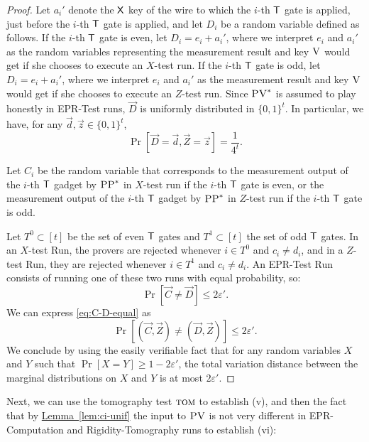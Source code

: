 \documentclass[11pt]{article}
\numberwithin{equation}{section}
\theoremstyle{definition}
\theoremstyle{plain}
\newcommand{\expref}[2]{\hyperref[#2]{#1~\ref{#2}}}
\newcommand{\eps}{\varepsilon}
\newcommand{\tom}{\textsc{tom}}
\newcommand{\ver}{\textsc{V}}
\newcommand{\pv}{\textsc{PV}}
\newcommand{\pp}{\textsc{PP}}
\begin{document}
\begin{proof}
Let $a_i'$ denote the $\sf X$ key of the wire to which the $i$-th $\sf T$ gate is applied, just before the $i$-th $\sf T$ gate is applied, and let $D_i$ be a random variable defined as follows. If the $i$-th $\sf T$ gate is even, let $D_i=e_i+a_i'$, where we interpret $e_i$ and $a_i'$ as the random variables representing the measurement result and key $\ver$ would get if she chooses to execute an $X$-test run. If the $i$-th $\sf T$ gate is odd, let $D_i=e_i+a_i'$, where we interpret $e_i$ and $a_i'$ as the measurement result and key $\ver$ would get if she chooses to execute an $Z$-test run. Since $\pv^*$ is assumed to play honestly in EPR-Test runs, $\vec{D}$ is uniformly distributed in $\{0,1\}^t$. In particular, we have, for any $\vec{d},\vec{z}\in\{0,1\}^t$,
\begin{equation}
\Pr[\vec{D}=\vec{d},\vec{Z}=\vec{z}]=\frac{1}{4^t}.\label{eq:D-unif}
\end{equation}

Let $C_i$ be the random variable that corresponds to the measurement output of
  the $i$-th $\sf T$ gadget by $\pp^*$ in $X$-test run if the $i$-th $\sf T$
  gate is even, or the measurement output of the $i$-th $\sf T$ gadget 
  by $\pp^*$ in $Z$-test run if the $i$-th $\sf T$ gate is odd.

Let $T^0\subset[t]$ be the set of even $\sf T$ gates and $T^1\subset[t]$ the set of odd $\sf T$ gates. In an $X$-test Run, the provers are rejected whenever $i\in T^0$ and $c_i\neq d_i$, and in a $Z$-test Run, they are rejected whenever $i\in T^1$ and $c_i\neq d_i$. An EPR-Test Run consists of running one of these two runs with equal probability, so:
\begin{equation}
\Pr[\vec{C}\neq\vec{D}]  \leq  2\eps'.\label{eq:C-D-equal}
\end{equation}
We can express \eqref{eq:C-D-equal} as
\begin{equation*}
\Pr[(\vec{C},\vec{Z})\neq(\vec{D},\vec{Z})]  \leq  2\eps'.
\end{equation*}
We conclude by using the easily verifiable fact that for any random variables $X$ and $Y$ such that $\Pr[X= Y]\geq 1-2\eps'$, the total variation distance between the marginal distributions on $X$ and $Y$ is at most $2\eps'$. 
\end{proof}

Next, we can use the tomography test $\tom$ to establish (v), and then the fact that by \expref{Lemma}{lem:ci-unif} the input to $\pv$ is not very different in EPR-Computation and Rigidity-Tomography runs to establish (vi):
\end{document}
